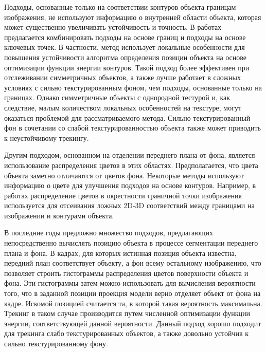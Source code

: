 Подходы, основанные только на соответствии контуров объекта границам
изображения, не используют информацию о внутренней области объекта, которая
может существенно увеличивать устойчивость и точность.
В работах \cite{VacchettiEdges2004,ChoiFeaturesAndEdges,Bugaev_2018_ECCV}
предлагается комбинировать подходы на основе границ и подходы на основе
ключевых точек.
В частности, метод \cite{Bugaev_2018_ECCV} использует локальные особенности для
повышения устойчивости алгоритма определения позиции объекта на основе
оптимизации функции энергии контуров.
Такой подход более эффективен при отслеживании симметричных объектов, а также
лучше работает в сложных условиях с сильно текстурированным фоном, чем подходы,
основанные только на границах.
Однако симметричные объекты с однородной тестурой и, как следствие, малым
количеством локальных особенностей на текстуре, могут оказаться проблемой для
рассматриваемого метода.
Сильно текстурированный фон в сочетании со слабой текстурированностью
объекта также может приводить к неустойчивому трекингу.

Другим подходом, основанном на отделении переднего плана от фона, является
использование распределения цветов в этих областях.
Предполагается, что цвета объекта заметно отличаются от цветов фона.
Некоторые методы \cite{SeoHinterstoisser2014,WangZhong2015,Zhong2018}
используют информацию о цвете для улучшения подходов на основе контуров.
Например, в работах \cite{SeoHinterstoisser2014,WangZhong2015} распределение
цветов в окрестности граничной точки изображения используется для отсеивания
ложных 2D-3D соответствий между границами на изображении и контурами объекта.

В последние годы предложно множество подходов, предлагающих непосредственно
вычислять позицию объекта в процессе сегментации переднего плана и фона.
В кадрах, для которых истинная позиция объекта известна, передний план
соответствует объекту, а фон всему остальному изображению, что позволяет
строить гистограммы распределения цветов поверхности объекта и фона.
Эти гистограммы затем можно использовать для вычисления вероятности того, что в
заданной позиции проекция модели верно отделяет объект от фона на кадре.
Искомой позицией считается та, в которой такая вероятность максимальна.
Трекинг в таком случае производится путем численной оптимизации функции
энергии, соответствующей данной вероятности.
Данный подход хорошо подходит для трекинга слабо текстурированных объектов, а
также довольно устойчив к сильно текстурированному фону.


